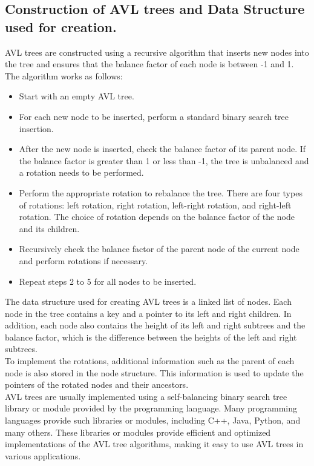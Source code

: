 \documentclass{article}
\begin{document}
\subsection{\textbf{Construction of AVL trees and Data Structure used for creation.}}
AVL trees are constructed using a recursive algorithm that inserts new nodes into the tree and ensures that the balance factor of each node is between -1 and 1. The algorithm works as follows:
\begin{itemize}
    \item Start with an empty AVL tree.
    \item For each new node to be inserted, perform a standard binary search tree insertion.
    \item After the new node is inserted, check the balance factor of its parent node. If the balance factor is greater than 1 or less than -1, the tree is unbalanced and a rotation needs to be performed.
    \item Perform the appropriate rotation to rebalance the tree. There are four types of rotations: left rotation, right rotation, left-right rotation, and right-left rotation. The choice of rotation depends on the balance factor of the node and its children.
    \item Recursively check the balance factor of the parent node of the current node and perform rotations if necessary.
    \item Repeat steps 2 to 5 for all nodes to be inserted.
\end{itemize}
The data structure used for creating AVL trees is a linked list of nodes. Each node in the tree contains a key and a pointer to its left and right children. In addition, each node also contains the height of its left and right subtrees and the balance factor, which is the difference between the heights of the left and right subtrees.\\

To implement the rotations, additional information such as the parent of each node is also stored in the node structure. This information is used to update the pointers of the rotated nodes and their ancestors.\\

AVL trees are usually implemented using a self-balancing binary search tree library or module provided by the programming language. Many programming languages provide such libraries or modules, including C++, Java, Python, and many others. These libraries or modules provide efficient and optimized implementations of the AVL tree algorithms, making it easy to use AVL trees in various applications.
\end{document}
